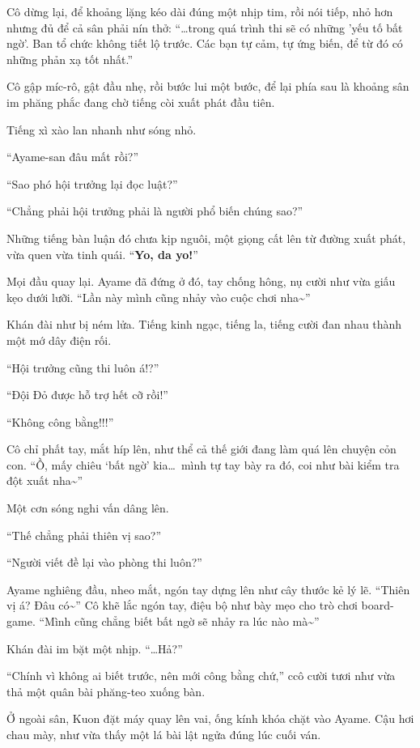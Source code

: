 \documentclass[../main.tex]{subfiles}
\begin{document}
Cô dừng lại, để khoảng lặng kéo dài đúng một nhịp tim, rồi nói tiếp, nhỏ hơn nhưng đủ để cả sân phải nín thở: ``\dots trong quá trình thi sẽ có những 'yếu tố bất ngờ'. Ban tổ chức không tiết lộ trước. Các bạn tự cảm, tự ứng biến, để từ đó có những phản xạ tốt nhất.''

Cô gập míc-rô, gật đầu nhẹ, rồi bước lui một bước, để lại phía sau là khoảng sân im phăng phắc đang chờ tiếng còi xuất phát đầu tiên.

Tiếng xì xào lan nhanh như sóng nhỏ.

``Ayame-san đâu mất rồi?''

``Sao phó hội trưởng lại đọc luật?''

``Chẳng phải hội trưởng phải là người phổ biến chúng sao?''

Những tiếng bàn luận đó chưa kịp nguôi, một giọng cất lên từ đường xuất phát, vừa quen vừa tinh quái. ``\textbf{Yo, da yo!}''

Mọi đầu quay lại. Ayame đã đứng ở đó, tay chống hông, nụ cười như vừa giấu kẹo dưới lưỡi. ``Lần này mình cũng nhảy vào cuộc chơi nha\~{}''

Khán đài như bị ném lửa. Tiếng kinh ngạc, tiếng la, tiếng cười đan nhau thành một mớ dây điện rối.

``Hội trưởng cũng thi luôn á!?''

``Đội Đỏ được hỗ trợ hết cỡ rồi!''

``Không công bằng!!!''

Cô chỉ phất tay, mắt híp lên, như thể cả thế giới đang làm quá lên chuyện cỏn con.
``Ồ, mấy chiêu `bất ngờ' kia\dots\ mình tự tay bày ra đó, coi như bài kiểm tra đột xuất nha\~{}''

Một cơn sóng nghi vấn dâng lên.

``Thế chẳng phải thiên vị sao?''

``Người viết đề lại vào phòng thi luôn?''

Ayame nghiêng đầu, nheo mắt, ngón tay dựng lên như cây thước kẻ lý lẽ. ``Thiên vị á? Đâu có\~{}'' Cô khẽ lắc ngón tay, điệu bộ như bày mẹo cho trò chơi board-game. ``Mình cũng chẳng biết bất ngờ sẽ nhảy ra lúc nào mà\~{}''

Khán đài im bặt một nhịp. ``\dots Hả?''

``Chính vì không ai biết trước, nên mới công bằng chứ,'' ccô cười tươi như vừa thả một quân bài phăng-teo xuống bàn.

Ở ngoài sân, Kuon đặt máy quay lên vai, ống kính khóa chặt vào Ayame. Cậu hơi chau mày, như vừa thấy một lá bài lật ngửa đúng lúc cuối ván.
\end{document}
